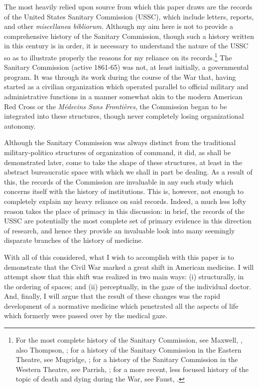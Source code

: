 \documentclass[12pt]{article}
\begin{document}
The most heavily relied upon source from which this paper draws are the records of the United States Sanitary Commission (USSC), which include letters,
reports, and other \textit{miscellanea bibliorum}. Although my aim here is not to provide a comprehensive history of the Sanitary Commission, though
such a history written in this century is in order, it is necessary to understand the nature of the USSC so as to illustrate properly the reasons
for my reliance on its records.\footnote{For the most complete history of the Sanitary Commission, see Maxwell, , also Thompson,
	; for a history of the Sanitary Commission in the Eastern Theatre, see Mugridge, ; for a
	history of the Sanitary Commission in the Western Theatre, see Parrish, ; for a more recent, less focused history of the topic of
	death	and dying during the War, see Faust, .} The Sanitary Commission (active 1861-65) was not, at least initially, a governmental
program. It was through its work during the course of the War that, having started as a civilian organization which operated parallel to official military
and administrative functions in a manner somewhat akin to the modern American Red Cross or the \textit{Médecins Sans Frontières}, the Commission began to
be integrated into these structures, though never completely losing organizational autonomy.\autocite[cf.][]{novom2020helping}

Although the Sanitary Commission was always distinct from the traditional military-politico structures of organization of command, it did, as shall be
demonstrated later, come to take the shape of these structures, at least in the abstract bureaucratic space with which we shall in part be dealing.
As a result of this, the records of the Commission are invaluable in any such study which concerns itself with the history of institutions. This is, however,
not enough to completely explain my heavy reliance on said records. Indeed, a much less lofty reason takes the place of primacy in this discussion:
in brief, the records of the USSC are potentially the most complete set of primary evidence in this direction of research, and hence they provide an
invaluable look into many seemingly disparate branches of the history of medicine.

With all of this considered, what I wish to accomplish with this paper is to demonstrate that the Civil War marked a great shift in American medicine. I will attempt
show that this shift was realized in two main ways: (i) structurally, in the ordering of spaces; and (ii) perceptually, in the gaze of the individual doctor. And,
finally, I will argue that the result of these changes was the rapid development of a normative medicine which penetrated all the aspects of life which formerly were
passed over by the medical gaze.
\end{document}
